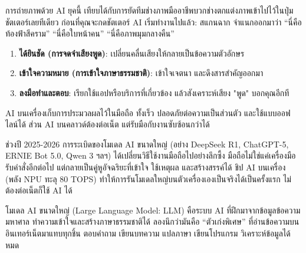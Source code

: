 


การถ่ายภาพด้วย AI ยุคนี้ เทียบได้กับการยัดทีมช่างภาพมืออาชีพบวกช่างตกแต่งภาพเข้าไปไว้ในปุ่มชัตเตอร์เลยทีเดียว ก่อนที่คุณจะกดชัตเตอร์ AI เริ่มทำงานไปแล้ว: สแกนฉาก จำแนกออกมาว่า “นี่คือท้องฟ้าสีคราม” “นี่คือใบหน้าคน” “นี่คือภาพมุมกลางคืน”


\begin{enumerate}
  \item \textbf{ได้ยินชัด (การจดจำเสียงพูด)}: เปลี่ยนคลื่นเสียงให้กลายเป็นข้อความตัวอักษร
  \item \textbf{เข้าใจความหมาย (การเข้าใจภาษาธรรมชาติ)}: เข้าใจเจตนา และดึงสารสำคัญออกมา
  \item \textbf{ลงมือทำและตอบ}: เรียกใช้แอปหรือบริการที่เกี่ยวข้อง แล้วสังเคราะห์เสียง "พูด" บอกคุณอีกที
\end{enumerate}


AI บนเครื่องเก็บการประมวลผลไว้ในมือถือ ทั้งเร็ว ปลอดภัยต่อความเป็นส่วนตัว และใช้แบบออฟไลน์ได้ ส่วน AI บนคลาวด์ต้องต่อเน็ต แต่รับมือกับงานซับซ้อนกว่าได้


ช่วงปี 2025-2026 การระเบิดของโมเดล AI ขนาดใหญ่ (อย่าง DeepSeek R1, ChatGPT-5, ERNIE Bot 5.0, Qwen 3 ฯลฯ) ได้เปลี่ยนวิธีใช้งานมือถือไปอย่างลึกซึ้ง มือถือไม่ใช่แค่เครื่องมือรับคำสั่งอีกต่อไป แต่กลายเป็นคู่หูอัจฉริยะที่เข้าใจ ใช้เหตุผล และสร้างสรรค์ได้ ชิป AI บนเครื่อง (พลัง NPU ทะลุ 80 TOPS) ทำให้การรันโมเดลใหญ่บนตัวเครื่องเองเป็นจริงได้เป็นครั้งแรก ไม่ต้องต่อเน็ตก็ใช้ AI ได้


โมเดล AI ขนาดใหญ่ (Large Language Model: LLM) คือระบบ AI ที่ฝึกมาจากข้อมูลข้อความมหาศาล ทำความเข้าใจและสร้างภาษาธรรมชาติได้ ลองนึกว่ามันคือ “ตัวเก่งพิเศษ” ที่อ่านข้อความบนอินเทอร์เน็ตมาแทบทุกชิ้น ตอบคำถาม เขียนบทความ แปลภาษา เขียนโปรแกรม วิเคราะห์ข้อมูลได้หมด

